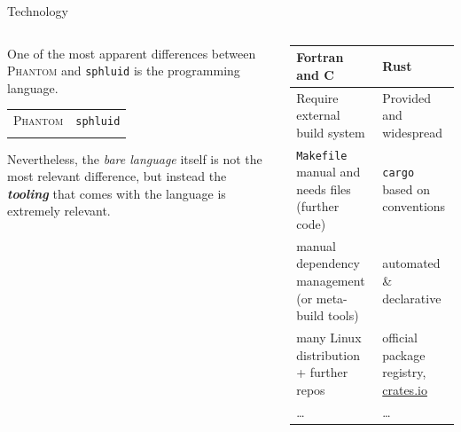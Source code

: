 \documentclass[9pt]{beamer}
\renewcommand{\phantom}{\textsc{Phantom}\xspace}
\newcommand{\sphluid}{\texttt{sphluid}\xspace}
\begin{document}
\begin{frame}{Technology}
    \begin{columns}
        \begin{column}{0.5\textwidth}
            One of the most apparent differences between \phantom and \sphluid
            is the programming language.

            \vspace*{5pt}
            \begin{table}
                \centering
                \hspace*{-15pt}
                \begin{tabular}{cc}
                    \phantom & \sphluid\\
                    \noindent\parbox[c]{0.5\hsize}{\includegraphics[width=0.48\textwidth]{langs-phantom}} &
                    \noindent\parbox[c]{0.5\hsize}{\includegraphics[width=0.48\textwidth]{langs-sphluid}}
                \end{tabular}
            \end{table}
            \vspace*{10pt}

            Nevertheless, the \textit{bare language} itself is not the most
            relevant difference, but instead the
            \textit{\textbf{\alert{tooling}}} that comes with the language is
            extremely relevant.
        \end{column}
        \begin{column}{0.5\textwidth}
            \begin{tabular}{m{0.45\hsize}|m{0.45\hsize}}
                \textbf{Fortran and C} & \textbf{Rust}\\
                \hline
                Require external build system &
                Provided and widespread\\
                \texttt{Makefile} manual and needs files (further code) &
                \texttt{cargo} based on conventions\\
                manual dependency management (or meta-build tools) &
                automated \& declarative\\
                many Linux distribution + further repos &
                official package registry, \url{crates.io}\\
                \dots & \dots
            \end{tabular}
            

\end{column}
\end{columns}
\end{frame}
\end{document}
